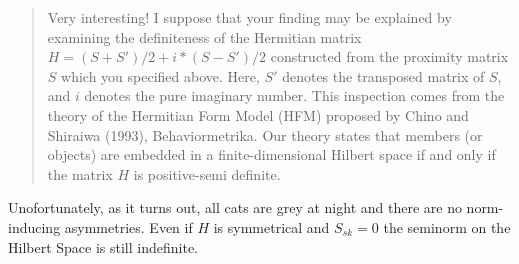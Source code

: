\documentclass[landscape,12pt]{article}
\begin{document}
\begin{quote}
  Very interesting! I suppose that your finding may be explained by
  examining the definiteness of the Hermitian matrix
  $H=(S+S')/2+i*(S-S')/2$ constructed from the proximity matrix $S$
  which you specified above. Here, $S'$ denotes the transposed matrix
  of $S$, and $i$ denotes the pure imaginary number. This inspection
  comes from the theory of the Hermitian Form Model (HFM) proposed by
  Chino and Shiraiwa (1993), Behaviormetrika. Our theory states that
  members (or objects) are embedded in a finite-dimensional Hilbert
  space if and only if the matrix $H$ is positive-semi definite.
\end{quote}

Unofortunately, as it turns out, all cats are grey at night and there
are no norm-inducing asymmetries. Even if $H$ is symmetrical and
$S_{sk}=0$ the seminorm on the Hilbert Space is still indefinite.


\end{document}
